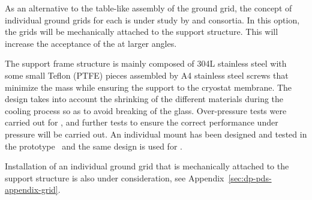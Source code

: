 
As an alternative to the table-like assembly of the ground grid, the concept of individual ground grids for each  is under study by  and \dual {} consortia. In this option, the grids will be mechanically attached to the support structure. This will increase the acceptance of the  at larger angles.

The support frame structure is mainly composed of \num{304}L stainless steel with some small Teflon (PTFE) pieces assembled by A4 stainless steel screws that minimize the mass while ensuring the  support to the cryostat membrane. The design %
takes into account the shrinking of the different materials during the cooling process so as to avoid breaking of the  glass.
Over-pressure tests were carried out for , and further tests to ensure the correct performance under pressure will be carried out. An individual  mount has been designed and tested in the   prototype~\cite{Zambelli:2017dkg} and the same design is used for .

Installation of an individual ground grid that is mechanically attached to the  support structure is also under consideration, see Appendix~\ref{sec:dp-pds-appendix-grid}.



